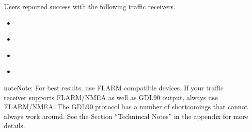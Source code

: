 \documentclass[letterpaper,10pt,english]{sphinxmanual}
\begin{document}
\sphinxAtStartPar
Users reported success with the following traffic receivers.
\begin{itemize}
\item {} 
\sphinxAtStartPar
{}%
\begin{footnote}[11]\sphinxAtStartFootnote
{}
%
\end{footnote}

\item {} 
\sphinxAtStartPar
{}%
\begin{footnote}[12]\sphinxAtStartFootnote
{}
%
\end{footnote}

\item {} 
\sphinxAtStartPar
{}%
\begin{footnote}[13]\sphinxAtStartFootnote
{}
%
\end{footnote}

\item {} 
\sphinxAtStartPar
{}%
\begin{footnote}[14]\sphinxAtStartFootnote
{}
%
\end{footnote}

\end{itemize}

\begin{sphinxadmonition}{note}{Note:}
\sphinxAtStartPar
For best results, use FLARM compatible devices.  If your traffic
receiver supports FLARM/NMEA as well as GDL90 output, always use FLARM/NMEA.
The GDL90 protocol has a number of shortcomings that  cannot always work around.  See the Section “Technincal Notes”
in the appendix for more details.
\end{sphinxadmonition}
\end{document}
